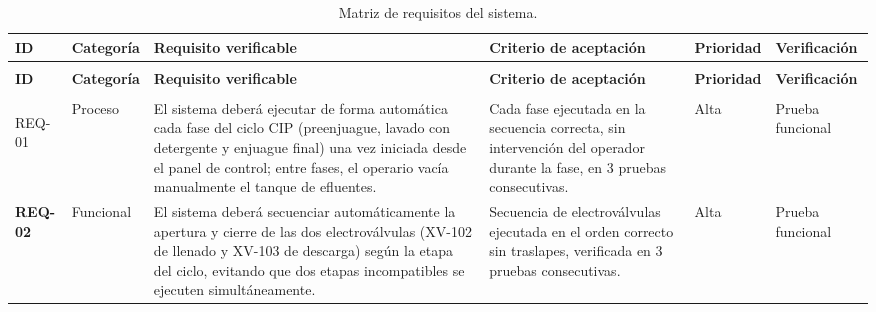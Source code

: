 \begingroup
\scriptsize
\setlength{\tabcolsep}{3pt}
\renewcommand{\arraystretch}{1.2}

\newlength{\colID}
\newlength{\colCat}
\newlength{\colReq}
\newlength{\colCrit}
\newlength{\colPrio}
\newlength{\colVer}

\setlength{\colID}{0.07\textwidth}
\setlength{\colCat}{0.13\textwidth}
\setlength{\colReq}{0.34\textwidth}
\setlength{\colCrit}{0.29\textwidth}
\setlength{\colPrio}{0.07\textwidth}
\setlength{\colVer}{0.10\textwidth}

\begin{longtable}{
  >{\bfseries}p{\colID}
  p{\colCat}
  p{\colReq}
  p{\colCrit}
  p{\colPrio}
  p{\colVer}
}
\caption{Matriz de requisitos del sistema.} \label{tab:matriz_requisitos} \\

\toprule
\textbf{ID} & \textbf{Categoría} & \textbf{Requisito verificable} & \textbf{Criterio de aceptación} & \textbf{Prioridad} & \textbf{Verificación} \\
\midrule
\endfirsthead

\multicolumn{6}{c}{\tablename\ \thetable\ -- continuación} \\
\toprule
\textbf{ID} & \textbf{Categoría} & \textbf{Requisito verificable} & \textbf{Criterio de aceptación} & \textbf{Prioridad} & \textbf{Verificación} \\
\midrule
\endhead

\midrule
\multicolumn{6}{r}{\textit{Continúa en la siguiente página}} \\
\endfoot

\bottomrule
\endlastfoot

REQ-01 & Proceso & El sistema deberá ejecutar de forma automática cada fase del ciclo CIP (preenjuague, lavado con detergente y enjuague final) una vez iniciada desde el panel de control; entre fases, el operario vacía manualmente el tanque de efluentes. & Cada fase ejecutada en la secuencia correcta, sin intervención del operador durante la fase, en 3 pruebas consecutivas. & Alta & Prueba funcional \\[3pt]

REQ-02 & Funcional & El sistema deberá secuenciar automáticamente la apertura y cierre de las dos electroválvulas (XV-102 de llenado y XV-103 de descarga) según la etapa del ciclo, evitando que dos etapas incompatibles se ejecuten simultáneamente. & Secuencia de electroválvulas ejecutada en el orden correcto sin traslapes, verificada en 3 pruebas consecutivas. & Alta & Prueba funcional \\[3pt]


\end{longtable}
